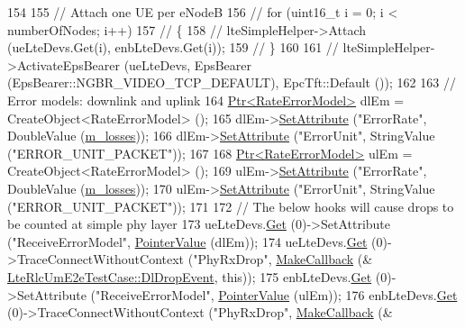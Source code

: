 \begin{DoxyCode}
154 
155   \textcolor{comment}{// Attach one UE per eNodeB}
156   \textcolor{comment}{// for (uint16\_t i = 0; i < numberOfNodes; i++)}
157   \textcolor{comment}{//   \{}
158   \textcolor{comment}{//     lteSimpleHelper->Attach (ueLteDevs.Get(i), enbLteDevs.Get(i));}
159   \textcolor{comment}{//   \}}
160 
161   \textcolor{comment}{// lteSimpleHelper->ActivateEpsBearer (ueLteDevs, EpsBearer (EpsBearer::NGBR\_VIDEO\_TCP\_DEFAULT),
       EpcTft::Default ());}
162 
163   \textcolor{comment}{// Error models: downlink and uplink}
164   \hyperlink{classns3_1_1Ptr}{Ptr<RateErrorModel>} dlEm = CreateObject<RateErrorModel> ();
165   dlEm->\hyperlink{classns3_1_1ObjectBase_ac60245d3ea4123bbc9b1d391f1f6592f}{SetAttribute} (\textcolor{stringliteral}{"ErrorRate"}, DoubleValue (\hyperlink{classLteRlcUmE2eTestCase_a1d6de8677532b47d1b7fd61d2081bb30}{m\_losses}));
166   dlEm->\hyperlink{classns3_1_1ObjectBase_ac60245d3ea4123bbc9b1d391f1f6592f}{SetAttribute} (\textcolor{stringliteral}{"ErrorUnit"}, StringValue (\textcolor{stringliteral}{"ERROR\_UNIT\_PACKET"}));
167 
168   \hyperlink{classns3_1_1Ptr}{Ptr<RateErrorModel>} ulEm = CreateObject<RateErrorModel> ();
169   ulEm->\hyperlink{classns3_1_1ObjectBase_ac60245d3ea4123bbc9b1d391f1f6592f}{SetAttribute} (\textcolor{stringliteral}{"ErrorRate"}, DoubleValue (\hyperlink{classLteRlcUmE2eTestCase_a1d6de8677532b47d1b7fd61d2081bb30}{m\_losses}));
170   ulEm->\hyperlink{classns3_1_1ObjectBase_ac60245d3ea4123bbc9b1d391f1f6592f}{SetAttribute} (\textcolor{stringliteral}{"ErrorUnit"}, StringValue (\textcolor{stringliteral}{"ERROR\_UNIT\_PACKET"}));
171 
172   \textcolor{comment}{// The below hooks will cause drops to be counted at simple phy layer}
173   ueLteDevs.\hyperlink{classns3_1_1NetDeviceContainer_a677d62594b5c9d2dea155cc5045f4d0b}{Get} (0)->SetAttribute (\textcolor{stringliteral}{"ReceiveErrorModel"}, \hyperlink{classns3_1_1PointerValue}{PointerValue} (dlEm));
174   ueLteDevs.\hyperlink{classns3_1_1NetDeviceContainer_a677d62594b5c9d2dea155cc5045f4d0b}{Get} (0)->TraceConnectWithoutContext (\textcolor{stringliteral}{"PhyRxDrop"}, \hyperlink{group__makecallbackmemptr_ga9376283685aa99d204048d6a4b7610a4}{MakeCallback} (&
      \hyperlink{classLteRlcUmE2eTestCase_a47966471970a9529eca31f78c36b298d}{LteRlcUmE2eTestCase::DlDropEvent}, \textcolor{keyword}{this}));
175   enbLteDevs.\hyperlink{classns3_1_1NetDeviceContainer_a677d62594b5c9d2dea155cc5045f4d0b}{Get} (0)->SetAttribute (\textcolor{stringliteral}{"ReceiveErrorModel"}, \hyperlink{classns3_1_1PointerValue}{PointerValue} (ulEm));
176   enbLteDevs.\hyperlink{classns3_1_1NetDeviceContainer_a677d62594b5c9d2dea155cc5045f4d0b}{Get} (0)->TraceConnectWithoutContext (\textcolor{stringliteral}{"PhyRxDrop"}, \hyperlink{group__makecallbackmemptr_ga9376283685aa99d204048d6a4b7610a4}{MakeCallback} (&

\end{DoxyCode}
